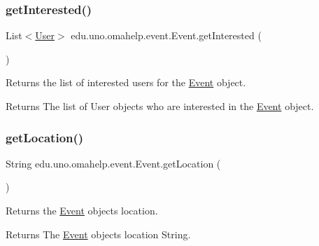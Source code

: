 \subsubsection{\texorpdfstring{get\+Interested()}{getInterested()}}
{\footnotesize\ttfamily List$<$\mbox{\hyperlink{classedu_1_1uno_1_1omahelp_1_1user_1_1_user}{User}}$>$ edu.\+uno.\+omahelp.\+event.\+Event.\+get\+Interested (\begin{DoxyParamCaption}{ }\end{DoxyParamCaption})}

Returns the list of interested users for the \mbox{\hyperlink{classedu_1_1uno_1_1omahelp_1_1event_1_1_event}{Event}} object.

\begin{DoxyReturn}{Returns}
The list of User objects who are interested in the \mbox{\hyperlink{classedu_1_1uno_1_1omahelp_1_1event_1_1_event}{Event}} object. 
\end{DoxyReturn}
\mbox{\label{classedu_1_1uno_1_1omahelp_1_1event_1_1_event_a58e699db30788b80eaea50c0edf0a9dd}} 
\subsubsection{\texorpdfstring{get\+Location()}{getLocation()}}
{\footnotesize\ttfamily String edu.\+uno.\+omahelp.\+event.\+Event.\+get\+Location (\begin{DoxyParamCaption}{ }\end{DoxyParamCaption})}

Returns the \mbox{\hyperlink{classedu_1_1uno_1_1omahelp_1_1event_1_1_event}{Event}} object\textquotesingle{}s location.

\begin{DoxyReturn}{Returns}
The \mbox{\hyperlink{classedu_1_1uno_1_1omahelp_1_1event_1_1_event}{Event}} object\textquotesingle{}s location String. 
\end{DoxyReturn}
\mbox{\label{classedu_1_1uno_1_1omahelp_1_1event_1_1_event_a8e0a4e313ebd5f0a3279810b2cde8f17}} 
